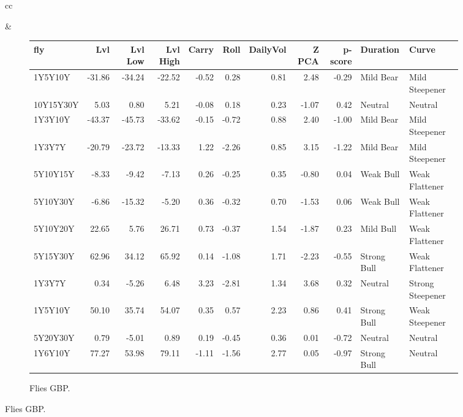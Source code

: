 \documentclass[a4paper,twoside]{report}
\begin{document}
\begin{figure}[htbp]
\begin{tabular}[c]{cc}
 
\begin{subfigure}[c]{0.5\textwidth}
 
 \end{subfigure}&
 
 \begin{subfigure}[c]{0.5\textwidth}
 \caption{Flies GBP.}
 \label{fig:Flies GBP}
 \begin{adjustbox}{max width=\textwidth}
 \begin{tabular}{lrrrrrrrrll}
\hline
       fly &    Lvl &  Lvl Low &  Lvl High &  Carry &  Roll &  DailyVol &  Z PCA &  p-score &     Duration &             Curve \\
\hline
   1Y5Y10Y & -31.86 &   -34.24 &    -22.52 &  -0.52 &  0.28 &      0.81 &   2.48 &    -0.29 &    Mild Bear &    Mild Steepener \\
 10Y15Y30Y &   5.03 &     0.80 &      5.21 &  -0.08 &  0.18 &      0.23 &  -1.07 &     0.42 &      Neutral &           Neutral \\
   1Y3Y10Y & -43.37 &   -45.73 &    -33.62 &  -0.15 & -0.72 &      0.88 &   2.40 &    -1.00 &    Mild Bear &    Mild Steepener \\
    1Y3Y7Y & -20.79 &   -23.72 &    -13.33 &   1.22 & -2.26 &      0.85 &   3.15 &    -1.22 &    Mild Bear &    Mild Steepener \\
  5Y10Y15Y &  -8.33 &    -9.42 &     -7.13 &   0.26 & -0.25 &      0.35 &  -0.80 &     0.04 &    Weak Bull &    Weak Flattener \\
  5Y10Y30Y &  -6.86 &   -15.32 &     -5.20 &   0.36 & -0.32 &      0.70 &  -1.53 &     0.06 &    Weak Bull &    Weak Flattener \\
  5Y10Y20Y &  22.65 &     5.76 &     26.71 &   0.73 & -0.37 &      1.54 &  -1.87 &     0.23 &    Mild Bull &    Weak Flattener \\
  5Y15Y30Y &  62.96 &    34.12 &     65.92 &   0.14 & -1.08 &      1.71 &  -2.23 &    -0.55 &  Strong Bull &    Weak Flattener \\
    1Y3Y7Y &   0.34 &    -5.26 &      6.48 &   3.23 & -2.81 &      1.34 &   3.68 &     0.32 &      Neutral &  Strong Steepener \\
   1Y5Y10Y &  50.10 &    35.74 &     54.07 &   0.35 &  0.57 &      2.23 &   0.86 &     0.41 &  Strong Bull &    Weak Steepener \\
  5Y20Y30Y &   0.79 &    -5.01 &      0.89 &   0.19 & -0.45 &      0.36 &   0.01 &    -0.72 &      Neutral &           Neutral \\
   1Y6Y10Y &  77.27 &    53.98 &     79.11 &  -1.11 & -1.56 &      2.77 &   0.05 &    -0.97 &  Strong Bull &           Neutral \\

\end{tabular}
\end{adjustbox}
\end{subfigure}
\end{tabular}
\end{figure}
\end{document}
